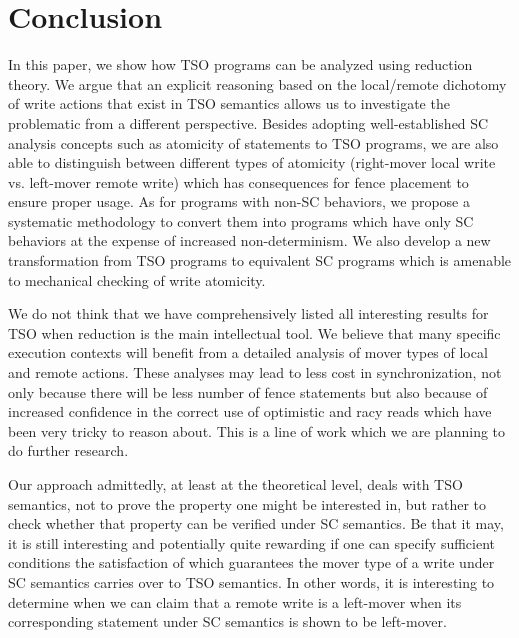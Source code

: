 \documentclass[preprint,9pt]{sigplanconf}
\begin{document}






\section{Conclusion}
\label{sec:conclusion}
In this paper, we show how TSO programs can be analyzed using reduction theory.
We argue that an explicit reasoning based on the local/remote dichotomy of write actions that exist in TSO semantics allows us to investigate the problematic from a different perspective. 
Besides adopting well-established SC analysis concepts such as atomicity of statements to TSO programs, we are also able to distinguish between different types of atomicity (right-mover local write vs. left-mover remote write) which has consequences for fence placement to ensure proper usage.
As for programs with non-SC behaviors, we propose a systematic methodology to convert them into programs which have only SC behaviors at the expense of increased non-determinism.
We also develop a new transformation from TSO programs to equivalent SC programs which is amenable to mechanical checking of write atomicity.

We do not think that we have comprehensively listed all interesting results for TSO when reduction is the main intellectual tool.
We believe that many specific execution contexts will benefit from a detailed analysis of mover types of local and remote actions.
These analyses may lead to less cost in synchronization, not only because there will be less number of fence statements but also because of increased confidence in the correct use of optimistic and racy reads which have been very tricky to reason about. 
This is a line of work which we are planning to do further research.

Our approach admittedly, at least at the theoretical level, deals with TSO semantics, not to prove the property one might be interested in, but rather to check whether that property can be verified under SC semantics.
Be that it may, it is still interesting and potentially quite rewarding if one can specify sufficient conditions the satisfaction of which guarantees the mover type of a write under SC semantics carries over to TSO semantics.
In other words, it is interesting to determine when we can claim that a remote write is a left-mover when its corresponding statement under SC semantics is shown to be left-mover.
\end{document}
